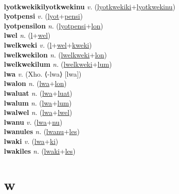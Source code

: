  \label{lyotkwekiki} \\
\textbf{lyotkwekikilyotkwekinu} \textit{v.} (\hyperref[lyotkwekiki]{lyotkwekiki}+\hyperref[lyotkwekinu]{lyotkwekinu})
 \label{lyotkwekikilyotkwekinu} \\
\textbf{lyotpensi} \textit{v.} (\hyperref[lyot]{lyot}+\hyperref[pensi]{pensi})
 \label{lyotpensi} \\
\textbf{lyotpensilon} \textit{n.} (\hyperref[lyotpensi]{lyotpensi}+\hyperref[lon]{lon})
 \label{lyotpensilon} \\
\textbf{lwel} \textit{n.} (\hyperref[l]{l}+\hyperref[wel]{wel})
 \label{lwel} \\
\textbf{lwelkweki} \textit{v.} (\hyperref[l]{l}+\hyperref[wel]{wel}+\hyperref[kweki]{kweki})
 \label{lwelkweki} \\
\textbf{lwelkwekilon} \textit{n.} (\hyperref[lwelkweki]{lwelkweki}+\hyperref[lon]{lon})
 \label{lwelkwekilon} \\
\textbf{lwelkwekilum} \textit{n.} (\hyperref[lwelkweki]{lwelkweki}+\hyperref[lum]{lum})
 \label{lwelkwekilum} \\
\textbf{lwa} \textit{v.} (Xho. ⟨-lwa⟩ [lwa])
 \label{lwa} \\
\textbf{lwalon} \textit{n.} (\hyperref[lwa]{lwa}+\hyperref[lon]{lon})
 \label{lwalon} \\
\textbf{lwaluat} \textit{n.} (\hyperref[lwa]{lwa}+\hyperref[luat]{luat})
 \label{lwaluat} \\
\textbf{lwalum} \textit{n.} (\hyperref[lwa]{lwa}+\hyperref[lum]{lum})
 \label{lwalum} \\
\textbf{lwalwel} \textit{n.} (\hyperref[lwa]{lwa}+\hyperref[lwel]{lwel})
 \label{lwalwel} \\
\textbf{lwanu} \textit{v.} (\hyperref[lwa]{lwa}+\hyperref[nu]{nu})
 \label{lwanu} \\
\textbf{lwanules} \textit{n.} (\hyperref[lwanu]{lwanu}+\hyperref[les]{les})
 \label{lwanules} \\
\textbf{lwaki} \textit{v.} (\hyperref[lwa]{lwa}+\hyperref[ki]{ki})
 \label{lwaki} \\
\textbf{lwakiles} \textit{n.} (\hyperref[lwaki]{lwaki}+\hyperref[les]{les})
 \label{lwakiles} 

\section{w}


